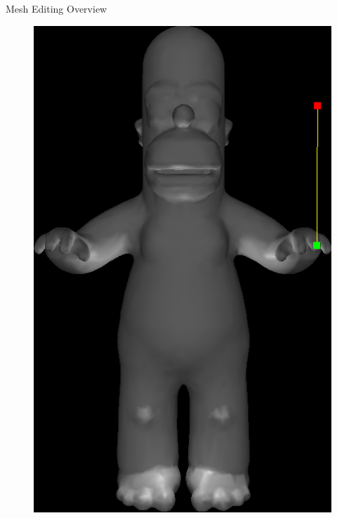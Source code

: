 \documentclass{beamer}
\begin{document}
\begin{frame}{Mesh Editing Overview}

\begin{figure}
\begin{minipage}{0.36\textwidth}
    \includegraphics[width=\textwidth]{HomerAnchor.png}
\end{minipage}
\end{figure}
\end{frame}
\end{document}

